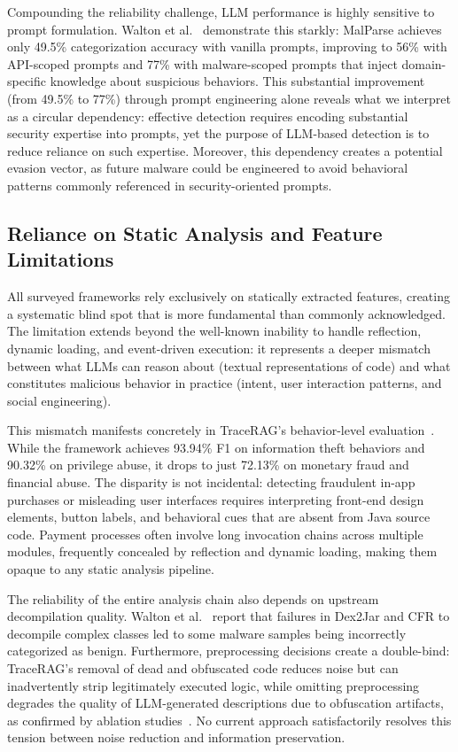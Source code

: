 Compounding the reliability challenge, LLM performance is highly sensitive to prompt formulation. Walton et al.~\cite{Walton2025-qi} demonstrate this starkly: MalParse achieves only 49.5\% categorization accuracy with vanilla prompts, improving to 56\% with API-scoped prompts and 77\% with malware-scoped prompts that inject domain-specific knowledge about suspicious behaviors. This substantial improvement (from 49.5\% to 77\%) through prompt engineering alone reveals what we interpret as a circular dependency: effective detection requires encoding substantial security expertise into prompts, yet the purpose of LLM-based detection is to reduce reliance on such expertise. Moreover, this dependency creates a potential evasion vector, as future malware could be engineered to avoid behavioral patterns commonly referenced in security-oriented prompts.

\subsection{Reliance on Static Analysis and Feature Limitations}

All surveyed frameworks rely exclusively on statically extracted features, creating a systematic blind spot that is more fundamental than commonly acknowledged. The limitation extends beyond the well-known inability to handle reflection, dynamic loading, and event-driven execution: it represents a deeper mismatch between what LLMs can reason about (textual representations of code) and what constitutes malicious behavior in practice (intent, user interaction patterns, and social engineering).

This mismatch manifests concretely in TraceRAG's behavior-level evaluation~\cite{Zhang2025-ot}. While the framework achieves 93.94\% F1 on information theft behaviors and 90.32\% on privilege abuse, it drops to just 72.13\% on monetary fraud and financial abuse. The disparity is not incidental: detecting fraudulent in-app purchases or misleading user interfaces requires interpreting front-end design elements, button labels, and behavioral cues that are absent from Java source code. Payment processes often involve long invocation chains across multiple modules, frequently concealed by reflection and dynamic loading, making them opaque to any static analysis pipeline.

The reliability of the entire analysis chain also depends on upstream decompilation quality. Walton et al.~\cite{Walton2025-qi} report that failures in Dex2Jar and CFR to decompile complex classes led to some malware samples being incorrectly categorized as benign. Furthermore, preprocessing decisions create a double-bind: TraceRAG's removal of dead and obfuscated code reduces noise but can inadvertently strip legitimately executed logic, while omitting preprocessing degrades the quality of LLM-generated descriptions due to obfuscation artifacts, as confirmed by ablation studies~\cite{Zhang2025-ot}. No current approach satisfactorily resolves this tension between noise reduction and information preservation.

